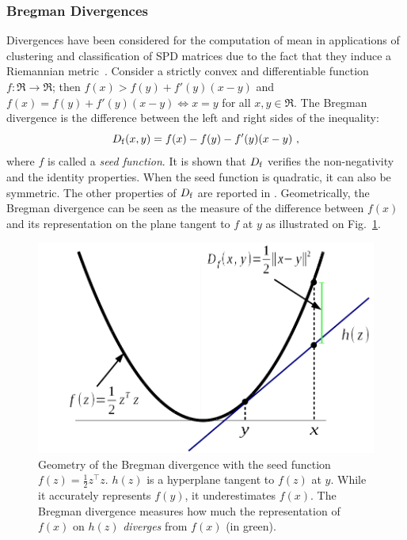 \subsubsection{Bregman Divergences}
\label{sec:bregman-divergence}
Divergences have been considered for the computation of mean in applications of clustering and classification of SPD matrices due to the fact that they induce a Riemannian metric~\cite{amari_information_2010}. %
Consider a strictly convex and differentiable function $f: \Re \rightarrow \Re$; then $f(x) > f(y) + f'(y)(x-y)$ and $f(x) = f(y) + f'(y)(x-y) \Leftrightarrow x = y$ for all $x,y \in \Re$.  
The Bregman divergence \cite{bregman_relaxation_1967} is the difference between the left and right sides of the inequality:
\begin{equation}
\divB{f}(x,y) = f(x)-f(y)-f'(y)(x-y) \ ,
\label{eq:bregman-div}
\end{equation} 
where $f$ is called a \emph{seed function}.
It is shown that $D_{\operatorname{f}}$ verifies the non-negativity and the identity properties. 
When the seed function is quadratic, it can also be symmetric. 
The other properties of $D_{\operatorname{f}}$ are reported in \cite{bregman_relaxation_1967}.
Geometrically, the Bregman divergence can be seen as the measure of the difference between $f(x)$ and its representation on the plane tangent to $f$ at $y$ as illustrated on Fig.~\ref{fig:bregman-projection}.

\begin{figure}[ht!]
	\begin{center}
	\includegraphics[width=0.6\columnwidth]{Figures/bregman_projection}
	\end{center}
	\caption{Geometry of the Bregman divergence with the seed function $f(z)=\frac{1}{2}z^\intercal z$. $h(z)$ is a hyperplane tangent to $f(z)$ at $y$. While it accurately represents $f(y)$, it underestimates $f(x)$. The Bregman divergence measures how much the representation of $f(x)$ on $h(z)$ \emph{diverges} from $f(x)$ (in green).}
	\label{fig:bregman-projection}
\end{figure}

